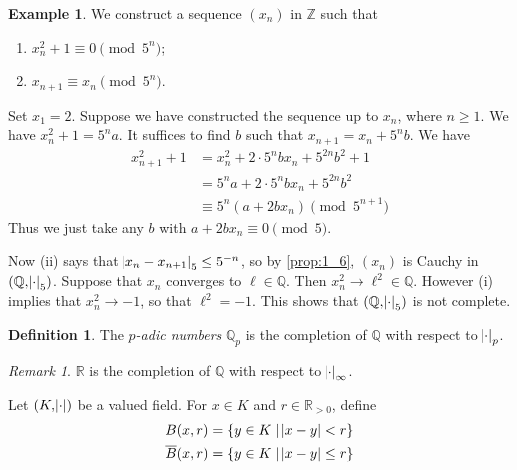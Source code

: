 \documentclass[11pt]{article}
\theoremstyle{definition}
\newtheorem{definition}{Definition}[subsection]
\newtheorem*{example}{Example}
\theoremstyle{plain}
\theoremstyle{remark}
\newtheorem*{remark}{Remark}
\newcommand{\ZZ}{\mathbb{Z}}
\newcommand{\QQ}{\mathbb{Q}}
\newcommand{\RR}{\mathbb{R}}
\begin{document}
\begin{example}
    We construct a sequence $(x_n)$ in $\ZZ$ such that
    \begin{enumerate}
        \item $x_n^2 + 1 \equiv 0 \pmod{5^n}$;
        \item $x_{n + 1} \equiv x_n \pmod{5^n}$.
    \end{enumerate}

    Set $x_1 = 2$. Suppose we have constructed the sequence up to $x_n$, where $n \ge 1$. We have $x_n^2 + 1 = 5^n a$. It suffices to find $b$ such that $x_{n+1} = x_n + 5^n b$. We have
    \begin{align*}
        x_{n+1}^2 + 1
        &= x_n^2 + 2 \cdot 5^n b x_n + 5^{2n} b^2 + 1\\
        &= 5^n a + 2 \cdot 5^n b x_n + 5^{2n} b^2\\
        &\equiv 5^n (a + 2 b x_n) \pmod{5^{n+1}}
    \end{align*}
    Thus we just take any $b$ with $a + 2b x_n \equiv 0 \pmod{5}$.

    Now (ii) says that $\abs{x_n - x_{n+1}}_5 \le 5^{-n}$, so by \autoref{prop:1_6}, $(x_n)$ is Cauchy in $(\QQ, \abs{\cdot}_5)$. Suppose that $x_n$ converges to $\ell \in \QQ$. Then $x_n^2 \rightarrow \ell^2 \in \QQ$. However (i) implies that $x_n^2 \rightarrow -1$, so that $\ell^2 = -1$. This shows that $(\QQ, \abs{\cdot}_5)$ is not complete.
\end{example}

\begin{definition}\label{def:1_7}
    The \emph{$p$-adic numbers} $\QQ_p$ is the completion of $\QQ$ with respect to $\abs{\cdot}_p$.
\end{definition}

\begin{remark}
    $\RR$ is the completion of $\QQ$ with respect to $\abs{\cdot}_\infty$.
\end{remark}

\noindent Let $(K, \abs{\cdot})$ be a valued field. For $x \in K$ and $r \in \RR_{> 0}$, define
\begin{align*}
    B(x, r) &= \{y \in K \mid \abs{x - y} < r\}\\
    \overline{B}(x, r) &= \{y \in K \mid \abs{x - y} \le r\}
\end{align*}
\end{document}
